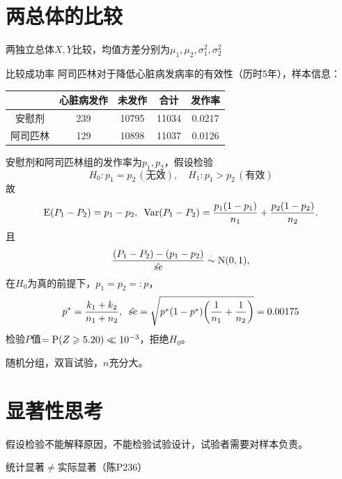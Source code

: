 \section{两总体的比较}
两独立总体$X,Y$比较，均值方差分别为$\mu_1,\mu_2,\sigma_1^2,\sigma_2^2$

\begin{example}{比较成功率}{}
	阿司匹林对于降低心脏病发病率的有效性（历时5年），样本信息：
	\begin{center}
		\begin{tabular}{c|cccc}
			\toprule
			&心脏病发作&未发作&合计&发作率\\
			\midrule
			安慰剂&239&10795&11034&0.0217\\
			阿司匹林&129&10898&11037&0.0126\\
			\bottomrule
		\end{tabular}
	\end{center}
	安慰剂和阿司匹林组的发作率为$p_1,p_2$，假设检验 
	\[
		H_0:p_1=p_2\,(\text{无效}),\quad H_1:p_1>p_2\,(\text{有效})
	\]
	故
	\[
		\E(P_1-P_2)=p_1-p_2,\enspace\Var(P_1-P_2)=\frac{p_1(1-p_1)}{n_1}+\frac{p_2(1-p_2)}{n_2}.
	\]
	且
	\[
		\frac{(P_1-P_2)-(p_1-p_2)}{\hat{se}}\dotsim\Norm(0,1),
	\]
	在$H_0$为真的前提下，$p_1=p_2=:p$，
	\[
		p^\ast=\frac{k_1+k_2}{n_1+n_2},\enspace\hat{se}=\sqrt{p^\ast(1-p^\ast)\biggkh{\frac1{n_1}+\frac1{n_2}}}=0.00175
	\]
	检验$P$值$=\P(Z\geqslant 5.20)\ll 10^{-3}$，拒绝$H_0$。
\end{example}
\begin{remark}
	随机分组，双盲试验，$n$充分大。
\end{remark}

\section{显著性思考}
假设检验不能解释原因，不能检验试验设计，试验者需要对样本负责。

统计显著$\neq$实际显著（陈P236）
